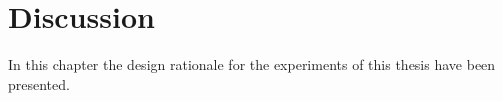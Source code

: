 












\section{Discussion} \label{sec:WE:discussion}

In this chapter the design rationale for the experiments of this thesis have been presented.






